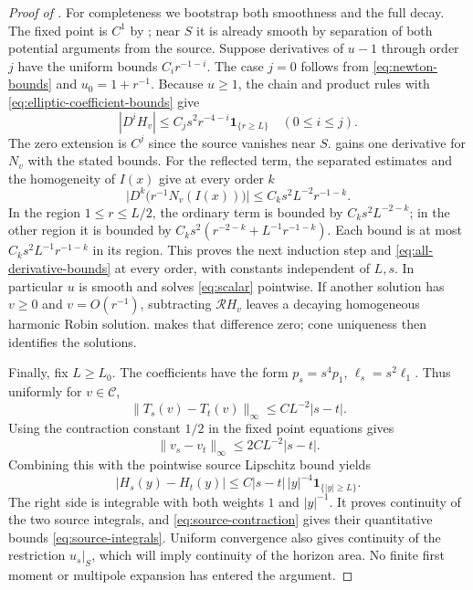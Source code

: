 \begin{proof}[Proof of ]
For completeness we bootstrap both smoothness and the full decay.
The fixed point is $C^1$ by ; near $S$ it is already
smooth by separation of both potential arguments from the source.
Suppose derivatives of $u-1$ through order $j$ have the uniform bounds
$C_i r^{-1-i}$.  The case $j=0$ follows from
\eqref{eq:newton-bounds} and $u_0=1+r^{-1}$.  Because $u\ge1$, the
chain and product rules with \eqref{eq:elliptic-coefficient-bounds}
give
\[
 |D^iH_v|\le C_js^2r^{-4-i}\mathbf1_{\{r\ge L\}}
 \quad(0\le i\le j).
\]
The zero extension is $C^j$ since the source vanishes near $S$.
 gains one derivative for $N_v$ with the stated
bounds.  For the reflected term, the separated estimates and the
homogeneity of $I(x)$ give at every order $k$
\[
 \bigl|D^k\bigl(r^{-1}N_v(I(x))\bigr)\bigr|
       \le C_ks^2L^{-2}r^{-1-k}.
\]
In the region $1\le r\le L/2$, the ordinary term is bounded by
$C_ks^2L^{-2-k}$; in the other region it is bounded by
$C_ks^2(r^{-2-k}+L^{-1}r^{-1-k})$.
Each bound is at most $C_ks^2L^{-1}r^{-1-k}$ in its region.
This proves the next induction step and \eqref{eq:all-derivative-bounds}
at every order, with constants independent of $L,s$.
In particular $u$ is smooth and solves \eqref{eq:scalar} pointwise.
If another solution has $v\ge0$ and $v=O(r^{-1})$, subtracting
$\mathcal RH_v$ leaves a decaying homogeneous harmonic Robin solution.
 makes that difference zero; cone uniqueness then
identifies the solutions.

Finally, fix $L\ge L_0$.  The coefficients have the form
$p_s=s^4p_1$, $\ell_s=s^2\ell_1$.  Thus uniformly for $v\in\mathcal C$,
\[
 \|T_s(v)-T_t(v)\|_\infty\le CL^{-2}|s-t|.
\]
Using the contraction constant $1/2$ in the fixed point equations gives
\[
 \|v_s-v_t\|_\infty\le 2CL^{-2}|s-t|.
\]
Combining this with the pointwise source Lipschitz bound yields
\[
 |H_s(y)-H_t(y)|\le C|s-t|\,|y|^{-4}
                    \mathbf1_{\{|y|\ge L\}}.
\]
The right side is integrable with both weights $1$ and $|y|^{-1}$.
It proves continuity of the two source integrals, and
\eqref{eq:source-contraction} gives their quantitative bounds
\eqref{eq:source-integrals}.  Uniform convergence also gives continuity
of the restriction $u_s|_S$, which will imply continuity of the horizon
area.  No finite first moment or multipole expansion has entered the
argument.
\end{proof}
